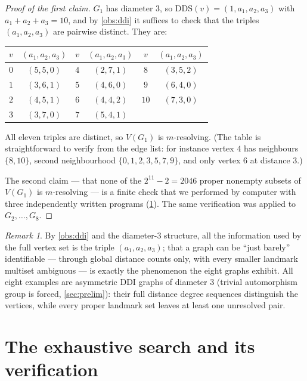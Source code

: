 \documentclass[11pt]{amsart}
\theoremstyle{remark}
\newtheorem{remark}[remark]{Remark}
\begin{document}
\begin{proof}[Proof of the first claim]
$G_1$ has diameter $3$, so $\mathrm{DDS}(v)=(1,a_1,a_2,a_3)$ with $a_1+a_2+a_3=10$, and by \cref{obs:ddi} it suffices to check that the triples $(a_1,a_2,a_3)$ are pairwise distinct.  They are:
\begin{center}
\small
\begin{tabular}{cc@{\qquad}cc@{\qquad}cc}
\toprule
$v$ & $(a_1,a_2,a_3)$ & $v$ & $(a_1,a_2,a_3)$ & $v$ & $(a_1,a_2,a_3)$\\
\midrule
$0$ & $(5,5,0)$ & $4$ & $(2,7,1)$ & $8$  & $(3,5,2)$\\
$1$ & $(3,6,1)$ & $5$ & $(4,6,0)$ & $9$  & $(6,4,0)$\\
$2$ & $(4,5,1)$ & $6$ & $(4,4,2)$ & $10$ & $(7,3,0)$\\
$3$ & $(3,7,0)$ & $7$ & $(5,4,1)$ &      &          \\
\bottomrule
\end{tabular}
\end{center}
All eleven triples are distinct, so $V(G_1)$ is $m$-resolving.  (The table is straightforward to verify from the edge list: for instance vertex $4$ has neighbours $\{8,10\}$, second neighbourhood $\{0,1,2,3,5,7,9\}$, and only vertex $6$ at distance $3$.)

The second claim --- that none of the $2^{11}-2=2046$ proper nonempty subsets of $V(G_1)$ is $m$-resolving --- is a finite check that we performed by computer with three independently written programs (\cref{sec:search}).  The same verification was applied to $G_2,\dots,G_8$.
\end{proof}

\begin{remark}
By \cref{obs:ddi} and the diameter-$3$ structure, all the information used by the full vertex set is the triple $(a_1,a_2,a_3)$; that a graph can be ``just barely'' identifiable --- through global distance counts only, with every smaller landmark multiset ambiguous --- is exactly the phenomenon the eight graphs exhibit.  All eight examples are asymmetric DDI graphs of diameter $3$ (trivial automorphism group is forced, \cref{sec:prelim}): their full distance degree sequences distinguish the vertices, while every proper landmark set leaves at least one unresolved pair.
\end{remark}

\section{The exhaustive search and its verification}\label{sec:search}
\end{document}
